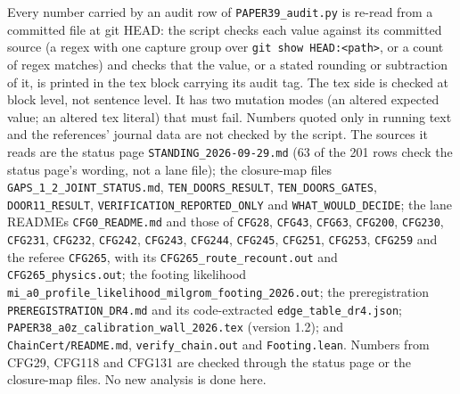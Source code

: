 \documentclass[10pt]{article}
\newcommand{\fpath}[1]{\nolinkurl{#1}}
\begin{document}
Every number carried by an audit row of \fpath{PAPER39_audit.py} is re-read from a committed file at git HEAD: the script checks each value against its committed source (a regex with one capture group over \texttt{git show HEAD:<path>}, or a count of regex matches) and checks that the value, or a stated rounding or subtraction of it, is printed in the tex block carrying its audit tag. The tex side is checked at block level, not sentence level. It has two mutation modes (an altered expected value; an altered tex literal) that must fail. Numbers quoted only in running text and the references' journal data are not checked by the script. The sources it reads are the status page \fpath{STANDING_2026-09-29.md} (63 of the 201 rows check the status page's wording, not a lane file); the closure-map files \fpath{GAPS_1_2_JOINT_STATUS.md}, \fpath{TEN_DOORS_RESULT}, \fpath{TEN_DOORS_GATES}, \fpath{DOOR11_RESULT}, \fpath{VERIFICATION_REPORTED_ONLY} and \fpath{WHAT_WOULD_DECIDE}; the lane READMEs \fpath{CFG0_README.md} and those of \fpath{CFG28}, \fpath{CFG43}, \fpath{CFG63}, \fpath{CFG200}, \fpath{CFG230}, \fpath{CFG231}, \fpath{CFG232}, \fpath{CFG242}, \fpath{CFG243}, \fpath{CFG244}, \fpath{CFG245}, \fpath{CFG251}, \fpath{CFG253}, \fpath{CFG259} and the referee \fpath{CFG265}, with its \fpath{CFG265_route_recount.out} and \fpath{CFG265_physics.out}; the footing likelihood \fpath{mi_a0_profile_likelihood_milgrom_footing_2026.out}; the preregistration \fpath{PREREGISTRATION_DR4.md} and its code-extracted \fpath{edge_table_dr4.json}; \fpath{PAPER38_a0z_calibration_wall_2026.tex} (version 1.2); and \fpath{ChainCert/README.md}, \fpath{verify_chain.out} and \fpath{Footing.lean}. Numbers from CFG29, CFG118 and CFG131 are checked through the status page or the closure-map files. No new analysis is done here.
\end{document}
